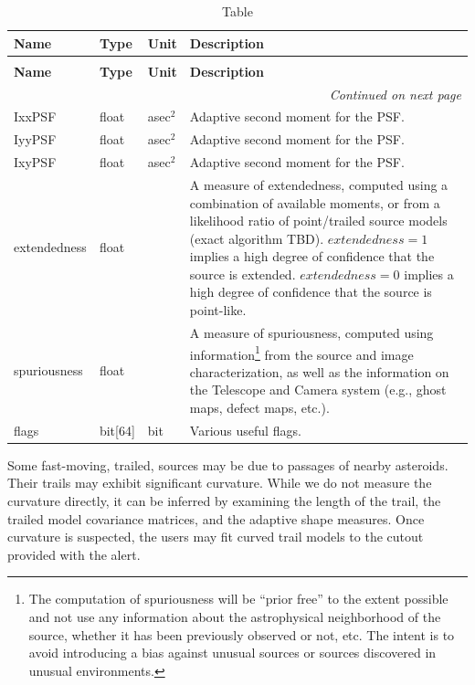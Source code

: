 \documentclass[SE,lsstdraft,toc]{lsstdoc}
\newenvironment{schema}[3]{%
\setlength\LTleft{0pt}
\setlength\LTright{\fill}
\begin{longtable}{p{0.2\textwidth}p{0.14\textwidth}p{0.14\textwidth}p{0.41\textwidth}}

\caption[#1]{#2\label{#3}}\\

\hline \textbf{Name} & \textbf{Type} & \textbf{Unit} & \textbf{Description}\\ \hline
\endfirsthead

\caption[#1]{#2}\\

\hline \textbf{Name} & \textbf{Type} & \textbf{Unit} & \textbf{Description}\\ \hline
\endhead

\hline \multicolumn{4}{r}{\emph{Continued on next page}} \\
\endfoot

\hline\hline
\endlastfoot
}{%
\hline
\end{longtable}
}
\begin{document}
\begin{schema}{\DIASource Table}{\DIASource Table}{tbl:diasourceTable}
IxxPSF & float & asec$^{2}$ & Adaptive second moment for the PSF. \\

IyyPSF & float & asec$^{2}$ & Adaptive second moment for the PSF. \\

IxyPSF & float & asec$^{2}$ & Adaptive second moment for the PSF. \\

extendedness & float & ~ & A measure of extendedness, computed using a combination of available moments, or from a likelihood ratio of point/trailed source models (exact algorithm TBD). $extendedness=1$ implies a high degree of confidence that the source is extended. $extendedness=0$ implies a high degree of confidence that the source is point-like. \\

spuriousness & float & ~ & A measure of spuriousness, computed using information\footnote{The computation
of spuriousness will be “prior free” to the extent possible and not use any information about the astrophysical neighborhood of the source, whether it has been previously observed or not, etc. The intent is to avoid introducing
a bias against unusual sources or sources discovered in unusual environments.}
from the source and image characterization, as well as the information on the Telescope and Camera system
(e.g., ghost maps, defect maps, etc.).
\\

flags & bit[64] & bit & Various useful flags.  \\
\end{schema}

Some fast-moving, trailed, sources may be due to passages of nearby asteroids. Their trails may exhibit significant curvature.
While we do not measure the curvature directly, it can be inferred by examining the length of the trail, the trailed model covariance matrices, and the adaptive shape measures. Once curvature is suspected, the users may fit curved trail models to the cutout provided with the alert.
\end{document}
